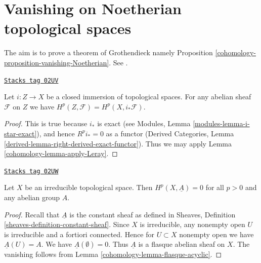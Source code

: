 \section{Vanishing on Noetherian topological spaces}
\label{cohomology-section-vanishing-Noetherian}
The aim is to prove a theorem of Grothendieck namely
Proposition \ref{cohomology-proposition-vanishing-Noetherian}. See \cite{Tohoku}.

\begin{lemma}
\label{cohomology-lemma-cohomology-and-closed-immersions}
\href{https://stacks.math.columbia.edu/tag/02UV}{\texttt{Stacks tag 02UV}}

Let $i : Z \to X$ be a closed immersion of topological spaces.
For any abelian sheaf $\mathcal{F}$ on $Z$ we have
$H^p(Z, \mathcal{F}) = H^p(X, i_*\mathcal{F})$.
\end{lemma}

\begin{proof}

This is true because $i_*$ is exact (see
Modules, Lemma \ref{modules-lemma-i-star-exact}),
and hence $R^pi_* = 0$ as a functor
(Derived Categories, Lemma \ref{derived-lemma-right-derived-exact-functor}).
Thus we may apply Lemma \ref{cohomology-lemma-apply-Leray}.
\end{proof}

\begin{lemma}
\label{cohomology-lemma-irreducible-constant-cohomology-zero}
\href{https://stacks.math.columbia.edu/tag/02UW}{\texttt{Stacks tag 02UW}}

Let $X$ be an irreducible topological space.
Then $H^p(X, \underline{A}) = 0$ for all $p > 0$
and any abelian group $A$.
\end{lemma}

\begin{proof}

Recall that $\underline{A}$ is the constant sheaf as defined
in Sheaves, Definition \ref{sheaves-definition-constant-sheaf}.
Since $X$ is irreducible, any nonempty open $U$ is
irreducible and a fortiori connected. Hence for $U \subset X$
nonempty open we have $\underline{A}(U) = A$.
We have $\underline{A}(\emptyset) = 0$. Thus $\underline{A}$
is a flasque abelian sheaf on $X$. The vanishing follows
from Lemma \ref{cohomology-lemma-flasque-acyclic}.
\end{proof}

